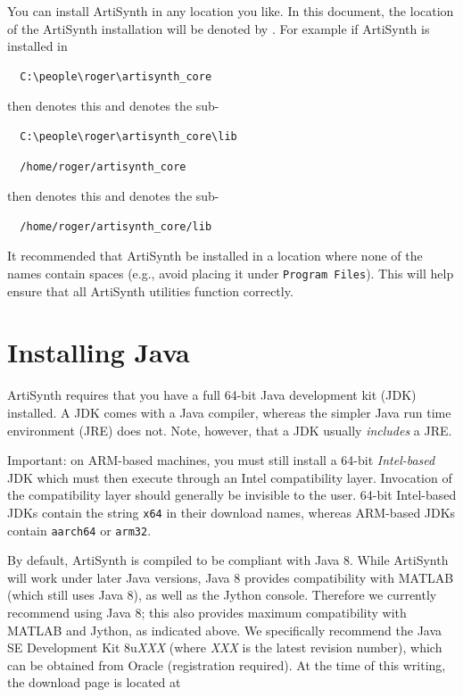You can install ArtiSynth in any location you like.
In this document, the location of the ArtiSynth installation \directory{}
will be denoted by \ArtHome[]. For example
if ArtiSynth is installed in
\ifWindows
\begin{verbatim}
  C:\people\roger\artisynth_core
\end{verbatim}
then \ArtHome[] denotes this \directory{}
and  denotes the sub-\directory{}
\begin{verbatim}
  C:\people\roger\artisynth_core\lib
\end{verbatim}
\else %
\begin{verbatim}
  /home/roger/artisynth_core
\end{verbatim}
then \ArtHome[] denotes this \directory{}
and  denotes the sub-\directory{}
\begin{verbatim}
  /home/roger/artisynth_core/lib
\end{verbatim}
\fi %

\ifLinux\else %
\begin{sideblock}
It recommended that ArtiSynth be installed in a location where none of
the \directory{} names contain spaces (e.g., avoid placing it under
{\tt Program Files}).  This will help ensure that all ArtiSynth
utilities function correctly.
\end{sideblock}
\fi %

\section{Installing Java}
\label{InstallingJava}

ArtiSynth requires that you have a full 64-bit Java development kit
(JDK) installed. A JDK comes with a Java compiler, whereas the simpler
Java run time environment (JRE) does not. Note, however, that a JDK
usually {\it includes} a JRE.

\begin{sideblock}
Important: on ARM-based machines, you must still install a 64-bit {\it
Intel-based} JDK which must then execute through an Intel
compatibility layer. Invocation of the compatibility layer should
generally be invisible to the user.  64-bit Intel-based JDKs
contain the string {\tt x64} in their download names, whereas
ARM-based JDKs contain {\tt aarch64} or {\tt arm32}.
\end{sideblock}

By default, ArtiSynth is compiled to be compliant with Java 8. While
ArtiSynth will work under later Java versions, Java 8 provides
compatibility with MATLAB (which still uses Java 8), as well as the
Jython console.  Therefore we currently recommend using Java 8; this
also provides maximum compatibility with MATLAB and Jython, as
indicated above. We specifically recommend the Java SE Development Kit
8u{\it XXX} (where {\it XXX} is the latest revision number), which can
be obtained from Oracle (registration required).  At the time of this
writing, the download page is located at

